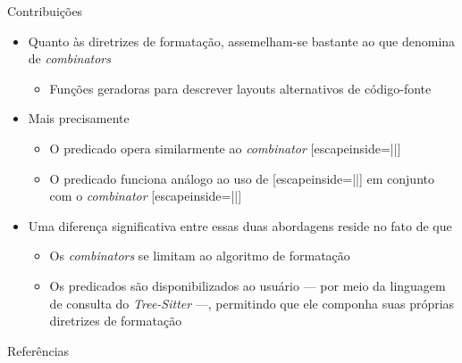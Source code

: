 \documentclass
  [ aspectratio=169,
    english,
    hyperref={citecolor=blue,colorlinks=true,linkcolor=blue,urlcolor=blue},
    brazil]
  {beamer}
\newcommand{\treesitter}{\textit{Tree-Sitter}\xspace}
\begin{document}
  \begin{frame}[fragile]{Contribuições}
    \begin{itemize}
      \item Quanto às diretrizes de formatação, assemelham-se bastante ao que
            \textcite{yelland-2015-new} denomina de \textit{combinators}
            \begin{itemize}
              \item Funções geradoras para descrever layouts alternativos de
                    código-fonte
            \end{itemize}
      \item Mais precisamente
            \begin{itemize}
              \item O predicado  opera similarmente
                    ao \textit{combinator}
                    \codesnippetinline{|$\leftrightarrow$|}[escapeinside=||]
              \item O predicado  funciona análogo ao
                    uso de
                    \codesnippetinline{|$\leftrightarrow$|}[escapeinside=||] em
                    conjunto com o \textit{combinator}
                    \codesnippetinline{|$\updownarrow$|}[escapeinside=||]
            \end{itemize}
      \item Uma diferença significativa entre essas duas abordagens reside no
            fato de que
            \begin{itemize}
              \item Os \textit{combinators} se limitam ao algoritmo de
                    formatação
              \item Os predicados são disponibilizados ao usuário --- por meio
                    da linguagem de consulta do \treesitter{} ---, permitindo
                    que ele componha suas próprias diretrizes de formatação
            \end{itemize}
    \end{itemize}
  \end{frame}


  \begin{frame}[allowframebreaks]{Referências}\printbibliography\end{frame}
\end{document}
